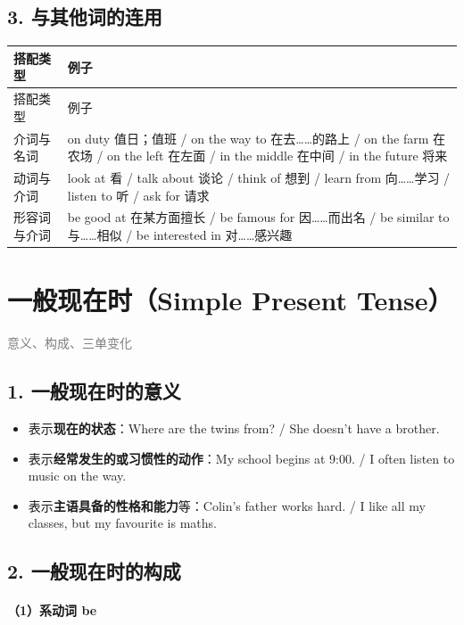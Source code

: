 \documentclass[11pt,a4paper]{ctexart}
\begin{document}
\subsection*{3. 与其他词的连用}

{\footnotesize
\begin{longtable}{p{6.70cm}p{6.70cm}}
\hline
搭配类型 & 例子 \\
\hline
\endfirsthead
\hline
搭配类型 & 例子 \\
\hline
\endhead
\hline
\endfoot
介词与名词 & on duty 值日；值班 / on the way to 在去……的路上 / on the farm 在农场 / on the left 在左面 / in the middle 在中间 / in the future 将来 \\
动词与介词 & look at 看 / talk about 谈论 / think of 想到 / learn from 向……学习 / listen to 听 / ask for 请求 \\
形容词与介词 & be good at 在某方面擅长 / be famous for 因……而出名 / be similar to 与……相似 / be interested in 对……感兴趣 \\
\end{longtable}
}

\section{一般现在时（Simple Present Tense）}
\noindent\textcolor{gray}{意义、构成、三单变化}\par\smallskip
\subsection*{1. 一般现在时的意义}

\begin{itemize}[leftmargin=1.4em]
\item 表示\textbf{现在的状态}：Where are the twins from? / She doesn’t have a brother.
\item 表示\textbf{经常发生的或习惯性的动作}：My school begins at 9:00. / I often listen to music on the way.
\item 表示\textbf{主语具备的性格和能力}等：Colin’s father works hard. / I like all my classes, but my favourite is maths.
\end{itemize}

\subsection*{2. 一般现在时的构成}

\paragraph{（1）系动词 be}
\end{document}
